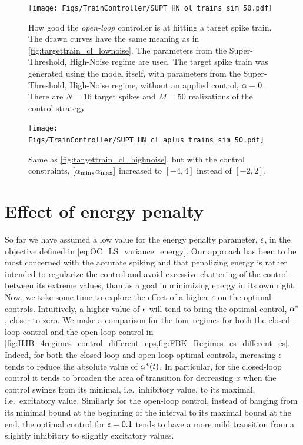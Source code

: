 \documentclass[12pt]{iopart}
\begin{document}
\begin{figure}[htp]
\begin{center}
  \texttt{[image: Figs/TrainController/SUPT\_HN\_ol\_trains\_sim\_50.pdf]}
  \caption[]{How good the {\sl open-loop} controller is at hitting a target
  spike train. 
  The drawn curves have  the same meaning as in
  \cref{fig:targettrain_cl_lownoise}.
  The parameters from the Super-Threshold, High-Noise regime
  are used. The target spike train was generated using the model itself, with
  parameters from the Super-Threshold, High-Noise regime, without an applied
  control, ${\alpha}=0$.
  There are $N=16$ target spikes and $M=50$ realizations of the control strategy}
  \label{fig:targettrain_ol_highnoise}    
\end{center}
\end{figure}

\begin{figure}[htp]
\begin{center}
  \texttt{[image: Figs/TrainController/SUPT\_HN\_cl\_aplus\_trains\_sim\_50.pdf]}
  \caption[ ]{Same as \cref{fig:targettrain_cl_highnoise}, but with the control
  constraints, $[{ {\alpha}_{\textrm{min}} }, { {\alpha}_{\textrm{max}} }]$ increased to $[-4,4]$ instead of $[-2,2]$.}
  \label{fig:targettrain_cl_highnoise_aplus}    
\end{center}
\end{figure} 

\section{Effect of energy penalty}
\label{sec:effect_of_eps}
So far we have assumed a low value for the energy penalty parameter,
${\epsilon}$, in the objective defined in \cref{eq:OC_LS_variance_energy}. Our
approach has been to be most concerned with the accurate spiking and
that penalizing energy is rather intended to regularize the control and avoid
excessive chattering of the control between its extreme values, than as a goal
in minimizing energy in its own right. Now, we take some time to explore the
effect of a higher ${\epsilon}$ on the optimal controls. Intuitively, a
higher value of ${\epsilon}$ will tend to bring the optimal control, ${\alpha}^*$, closer
to zero. We make a comparison for the four regimes for both the
closed-loop control and the open-loop control in
\cref{fig:HJB_4regimes_control_different_eps,fig:FBK_Regimes_cs_different_es}.
Indeed, for both the closed-loop and open-loop optimal controls, increasing
${\epsilon}$ tends to reduce the absolute value of ${\alpha}^*(t)$. In particular, for the
closed-loop control it tends to broaden the area of transition for
decreasing $x$ when the control swings from its minimal, i.e.\ inhibitory value,
to its maximal, i.e.\ excitatory value. Similarly for the open-loop control,
instead of banging from its minimal bound at the beginning of the interval to
its maximal bound at the end, the optimal control for ${\epsilon} = 0.1$ tends to have a
more mild transition from a slightly inhibitory to slightly excitatory
values.
  
\end{document}
